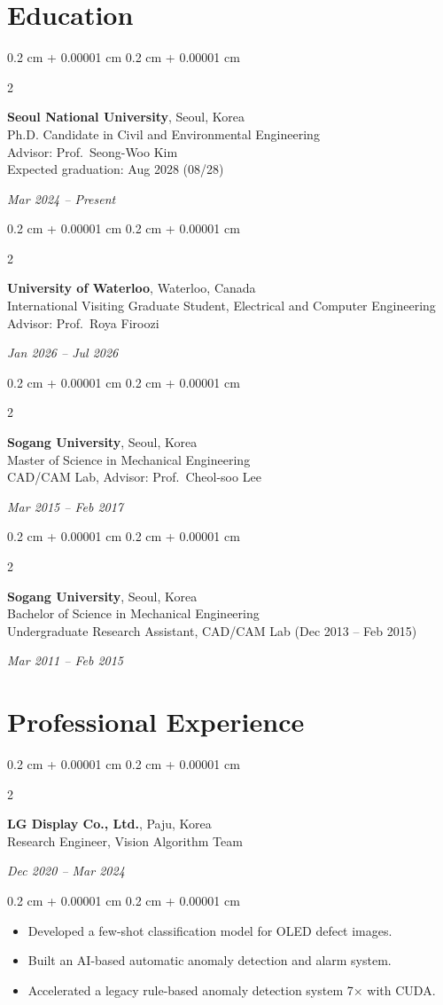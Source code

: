 \documentclass[10pt, letterpaper]{article}
\newenvironment{highlights}{
    \begin{itemize}[
        topsep=0.10 cm,
        parsep=0.10 cm,
        partopsep=0pt,
        itemsep=0pt,
        leftmargin=0.4 cm + 10pt
    ]
}{
    \end{itemize}
} %
\newenvironment{onecolentry}{
    \begin{adjustwidth}{
        0.2 cm + 0.00001 cm
    }{
        0.2 cm + 0.00001 cm
    }
}{
    \end{adjustwidth}
} %
\newenvironment{twocolentry}[2][]{
    \onecolentry
    \def\secondColumn{#2}
    \setcolumnwidth{\fill, 4.5 cm}
    \begin{paracol}{2}
}{
    \switchcolumn \raggedleft \secondColumn
    \end{paracol}
    \endonecolentry
} %
\begin{document}
\section{Education}
\begin{twocolentry}{\textit{Mar 2024 -- Present}}
\textbf{Seoul National University}, Seoul, Korea\\
Ph.D. Candidate in Civil and Environmental Engineering\\
Advisor: Prof.~Seong-Woo Kim\\
Expected graduation: Aug 2028 (08/28)
\end{twocolentry}

\vspace{0.2 cm}

\begin{twocolentry}{\textit{Jan 2026 -- Jul 2026}}
\textbf{University of Waterloo}, Waterloo, Canada\\
International Visiting Graduate Student, Electrical and Computer Engineering\\
Advisor: Prof.~Roya Firoozi
\end{twocolentry}

\vspace{0.2 cm}


\begin{twocolentry}{\textit{Mar 2015 -- Feb 2017}}
\textbf{Sogang University}, Seoul, Korea\\
Master of Science in Mechanical Engineering\\
CAD/CAM Lab, Advisor: Prof.~Cheol-soo Lee
\end{twocolentry}

\vspace{0.2 cm}

\begin{twocolentry}{\textit{Mar 2011 -- Feb 2015}}
\textbf{Sogang University}, Seoul, Korea\\
Bachelor of Science in Mechanical Engineering\\
Undergraduate Research Assistant, CAD/CAM Lab (Dec 2013 -- Feb 2015)
\end{twocolentry}

\section{Professional Experience}
\begin{twocolentry}{\textit{Dec 2020 -- Mar 2024}}
\textbf{LG Display Co., Ltd.}, Paju, Korea\\
Research Engineer, Vision Algorithm Team
\end{twocolentry}
\begin{onecolentry}
\begin{highlights}
    \item Developed a few-shot classification model for OLED defect images.
    \item Built an AI-based automatic anomaly detection and alarm system.
    \item Accelerated a legacy rule-based anomaly detection system 7$\times$ with CUDA.
\end{highlights}
\end{onecolentry}
\end{document}
